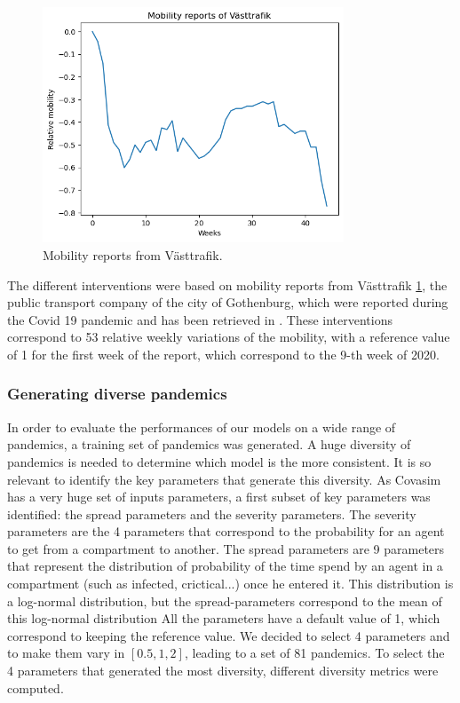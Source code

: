 \begin{figure}
    \centering
    \includegraphics[width=0.8\textwidth]{figures/mobility_reports.png}
    \caption{Mobility reports from Västtrafik.}
    \label{fig:mobility_reports}
\end{figure}


The different interventions were based on mobility reports from Västtrafik  \ref{fig:mobility_reports}, the public transport company of the city of Gothenburg, which were reported during the Covid 19 pandemic and has been retrieved in \cite{gerlee2021predicting}.
These interventions correspond to 53 relative weekly variations of the mobility, with a reference value of 1 for the first week of the report, which correspond to the 9-th week of 2020. 


\subsubsection{Generating diverse pandemics}

In order to evaluate the performances of our models on a wide range of pandemics, a training set of pandemics was generated. 
A huge diversity of pandemics is needed to determine which model is the more consistent.
It is so relevant to identify the key parameters that generate this diversity.
As Covasim has a very huge set of inputs parameters, a first subset of key parameters was identified: the spread parameters and the severity parameters. 
The severity parameters are the 4 parameters that correspond to the probability for an agent to get from a compartment to another. 
The spread parameters are 9 parameters that represent the distribution of probability of the time spend by an agent in a compartment (such as infected, crictical...) once he entered it. 
This distribution is a log-normal distribution, but the spread-parameters correspond to the mean of this log-normal distribution
All the parameters have a default value of 1, which correspond to keeping the reference value. 
We decided to select 4 parameters and to make them vary in $[0.5, 1, 2]$, leading to a set of 81 pandemics. 
To select the 4 parameters that generated the most diversity, different diversity metrics were computed. 

